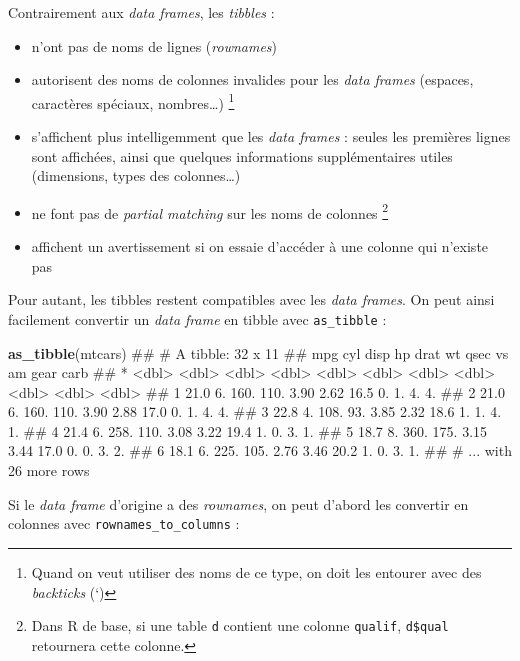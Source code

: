 \documentclass[]{book}
\newenvironment{Shaded}{\begin{snugshade}}{\end{snugshade}}
\newcommand{\KeywordTok}[1]{\textcolor[rgb]{0.13,0.29,0.53}{\textbf{#1}}}
\newcommand{\NormalTok}[1]{#1}
\providecommand{\tightlist}{%
  \setlength{\itemsep}{0pt}\setlength{\parskip}{0pt}}
\let\rmarkdownfootnote\footnote%
\def\footnote{\protect\rmarkdownfootnote}
\theoremstyle{definition}
\theoremstyle{definition}
\theoremstyle{definition}
\theoremstyle{remark}
\begin{document}
Contrairement aux \emph{data frames}, les \emph{tibbles} :

\begin{itemize}
\tightlist
\item
  n'ont pas de noms de lignes (\emph{rownames})
\item
  autorisent des noms de colonnes invalides pour les \emph{data frames}
  (espaces, caractères spéciaux, nombres\ldots{}) \footnote{Quand on
    veut utiliser des noms de ce type, on doit les entourer avec des
    \emph{backticks} (`)}
\item
  s'affichent plus intelligemment que les \emph{data frames} : seules
  les premières lignes sont affichées, ainsi que quelques informations
  supplémentaires utiles (dimensions, types des colonnes\ldots{})
\item
  ne font pas de \emph{partial matching} sur les noms de colonnes
  \footnote{Dans R de base, si une table \texttt{d} contient une colonne
    \texttt{qualif}, \texttt{d\$qual} retournera cette colonne.}
\item
  affichent un avertissement si on essaie d'accéder à une colonne qui
  n'existe pas
\end{itemize}

Pour autant, les tibbles restent compatibles avec les \emph{data
frames}. On peut ainsi facilement convertir un \emph{data frame} en
tibble avec \texttt{as\_tibble} :

\begin{Shaded}
\begin{Highlighting}[]
\KeywordTok{as_tibble}\NormalTok{(mtcars)}
\NormalTok{## # A tibble: 32 x 11}
\NormalTok{##     mpg   cyl  disp    hp  drat    wt  qsec    vs    am  gear  carb}
\NormalTok{## * <dbl> <dbl> <dbl> <dbl> <dbl> <dbl> <dbl> <dbl> <dbl> <dbl> <dbl>}
\NormalTok{## 1  21.0    6.  160.  110.  3.90  2.62  16.5    0.    1.    4.    4.}
\NormalTok{## 2  21.0    6.  160.  110.  3.90  2.88  17.0    0.    1.    4.    4.}
\NormalTok{## 3  22.8    4.  108.   93.  3.85  2.32  18.6    1.    1.    4.    1.}
\NormalTok{## 4  21.4    6.  258.  110.  3.08  3.22  19.4    1.    0.    3.    1.}
\NormalTok{## 5  18.7    8.  360.  175.  3.15  3.44  17.0    0.    0.    3.    2.}
\NormalTok{## 6  18.1    6.  225.  105.  2.76  3.46  20.2    1.    0.    3.    1.}
\NormalTok{## # ... with 26 more rows}
\end{Highlighting}
\end{Shaded}

Si le \emph{data frame} d'origine a des \emph{rownames}, on peut d'abord
les convertir en colonnes avec \texttt{rownames\_to\_columns} :
\end{document}
